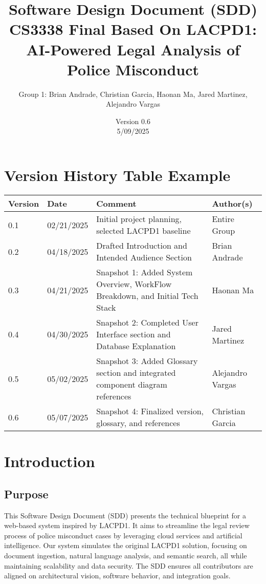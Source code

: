 \documentclass[11pt]{article}
\title{Software Design Document (SDD) \\
CS3338 Final Based On LACPD1: AI-Powered Legal Analysis of Police Misconduct}
\author{Group 1: Brian Andrade, Christian Garcia, Haonan Ma, Jared Martinez, Alejandro Vargas}
\date{Version 0.6 \\ 5/09/2025}
\begin{document}
\maketitle
\thispagestyle{empty}
\newpage

\tableofcontents
\thispagestyle{empty}
\newpage

\section*{Version History Table Example}
\begin{longtable}{|l|l|p{8cm}|l|}
\hline
\textbf{Version} & \textbf{Date} & \textbf{Comment} & \textbf{Author(s)} \\
\hline
0.1 & 02/21/2025 & Initial project planning, selected LACPD1 baseline & Entire Group \\
0.2 & 04/18/2025 & Drafted Introduction and Intended Audience Section & Brian Andrade \\
0.3 & 04/21/2025 & Snapshot 1: Added System Overview, WorkFlow Breakdown, and Initial Tech Stack  & Haonan Ma \\
0.4 & 04/30/2025 & Snapshot 2: Completed User Interface section and Database Explanation  & Jared Martinez \\
0.5 & 05/02/2025 & Snapshot 3: Added Glossary section and integrated component diagram references  & Alejandro Vargas \\
0.6 & 05/07/2025 & Snapshot 4: Finalized version, glossary, and references & Christian Garcia \\
\hline
\end{longtable}

\newpage
\section{Introduction}
\subsection{Purpose}
This Software Design Document (SDD) presents the technical blueprint for a web-based system inspired by LACPD1. It aims to streamline the legal review process of police misconduct cases by leveraging cloud services and artificial intelligence. Our system simulates the original LACPD1 solution, focusing on document ingestion, natural language analysis, and semantic search, all while maintaining scalability and data security. The SDD ensures all contributors are aligned on architectural vision, software behavior, and integration goals.
\end{document}
